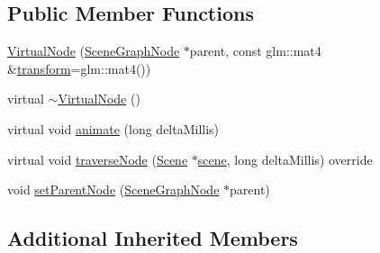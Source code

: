 \subsection*{Public Member Functions}
\begin{DoxyCompactItemize}
\item 
\hyperlink{classmotorcar_1_1VirtualNode_acee2e50a0321f81714a7984ce2effbbd}{Virtual\-Node} (\hyperlink{classmotorcar_1_1SceneGraphNode}{Scene\-Graph\-Node} $\ast$parent, const glm\-::mat4 \&\hyperlink{classmotorcar_1_1SceneGraphNode_ad96e79fdd739ac8223a3128003be391a}{transform}=glm\-::mat4())
\item 
virtual \hyperlink{classmotorcar_1_1VirtualNode_afb80a6d7b8ac5b3137357873d63a31c8}{$\sim$\-Virtual\-Node} ()
\item 
virtual void \hyperlink{classmotorcar_1_1VirtualNode_a43eca360af74fd3684a8f3d62a6aff35}{animate} (long delta\-Millis)
\item 
virtual void \hyperlink{classmotorcar_1_1VirtualNode_ad0eda301331d02d5bf03d13432e62d17}{traverse\-Node} (\hyperlink{classmotorcar_1_1Scene}{Scene} $\ast$\hyperlink{classmotorcar_1_1SceneGraphNode_aa14e637ed4ae98f77e28941a4b5cfdd8}{scene}, long delta\-Millis) override
\item 
void \hyperlink{classmotorcar_1_1VirtualNode_aacea6d6974e649331232372d440b6505}{set\-Parent\-Node} (\hyperlink{classmotorcar_1_1SceneGraphNode}{Scene\-Graph\-Node} $\ast$parent)
\end{DoxyCompactItemize}
\subsection*{Additional Inherited Members}


